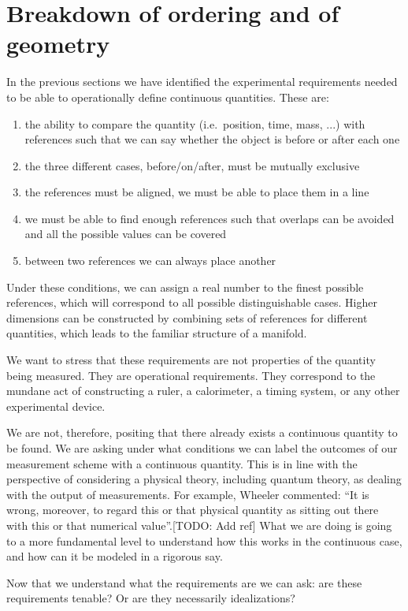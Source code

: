 \documentclass[12pt]{iopart}
\begin{document}
\section{Breakdown of ordering and of geometry}

In the previous sections we have identified the experimental requirements needed to be able to operationally define continuous quantities. These are:
\begin{enumerate}
	\item the ability to compare the quantity (i.e.~position, time, mass, ...) with references such that we can say whether the object is before or after each one
	\item the three different cases, before/on/after, must be mutually exclusive
	\item the references must be aligned, we must be able to place them in a line
	\item we must be able to find enough references such that overlaps can be avoided and all the possible values can be covered
	\item between two references we can always place another
\end{enumerate}
Under these conditions, we can assign a real number to the finest possible references, which will correspond to all possible distinguishable cases. Higher dimensions can be constructed by combining sets of references for different quantities, which leads to the familiar structure of a manifold.

We want to stress that these requirements are not properties of the quantity being measured. They are operational requirements. They correspond to the mundane act of constructing a ruler, a calorimeter, a timing system, or any other experimental device.

We are not, therefore, positing that there already exists a continuous quantity to be found. We are asking under what conditions we can label the outcomes of our measurement scheme with a continuous quantity. This is in line with the perspective of considering a physical theory, including quantum theory, as dealing with the output of measurements. For example, Wheeler commented: ``It is wrong, moreover, to regard this or that physical quantity as sitting out there with this or that numerical value''.[TODO: Add ref] What we are doing is going to a more fundamental level to understand how this works in the continuous case, and how can it be modeled in a rigorous say.

Now that we understand what the requirements are we can ask: are these requirements tenable? Or are they necessarily idealizations?
\end{document}
